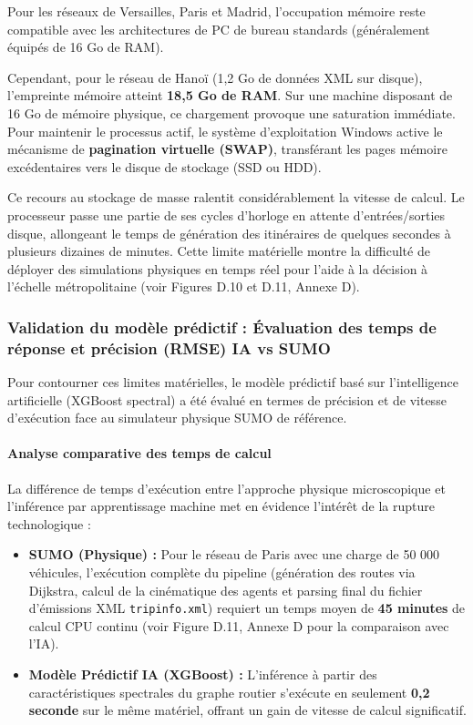 \documentclass[10pt, a4paper]{article}
\providecommand{\tightlist}{}
\begin{document}
Pour les réseaux de Versailles, Paris et Madrid, l'occupation mémoire
reste compatible avec les architectures de PC de bureau standards
(généralement équipés de 16 Go de RAM).

Cependant, pour le réseau de Hanoï (1,2 Go de données XML sur disque),
l'empreinte mémoire atteint \textbf{18,5 Go de RAM}. Sur une machine
disposant de 16 Go de mémoire physique, ce chargement provoque une
saturation immédiate. Pour maintenir le processus actif, le système
d'exploitation Windows active le mécanisme de \textbf{pagination
virtuelle (SWAP)}, transférant les pages mémoire excédentaires vers le
disque de stockage (SSD ou HDD).

Ce recours au stockage de masse ralentit considérablement la vitesse de
calcul. Le processeur passe une partie de ses cycles d'horloge en
attente d'entrées/sorties disque, allongeant le temps de génération des
itinéraires de quelques secondes à plusieurs dizaines de minutes. Cette
limite matérielle montre la difficulté de déployer des simulations
physiques en temps réel pour l'aide à la décision à l'échelle
métropolitaine (voir Figures D.10 et D.11, Annexe D).

\subsubsection{Validation du modèle prédictif : Évaluation des temps de
réponse et précision (RMSE) IA vs
SUMO}\label{validation-du-moduxe8le-pruxe9dictif-uxe9valuation-des-temps-de-ruxe9ponse-et-pruxe9cision-rmse-ia-vs-sumo}

Pour contourner ces limites matérielles, le modèle prédictif basé sur
l'intelligence artificielle (XGBoost spectral) a été évalué en termes de
précision et de vitesse d'exécution face au simulateur physique SUMO de
référence.

\paragraph{Analyse comparative des temps de
calcul}\label{analyse-comparative-des-temps-de-calcul}

La différence de temps d'exécution entre l'approche physique
microscopique et l'inférence par apprentissage machine met en évidence
l'intérêt de la rupture technologique :

\begin{itemize}
\tightlist
\item
  \textbf{SUMO (Physique) :} Pour le réseau de Paris avec une charge de
  50 000 véhicules, l'exécution complète du pipeline (génération des
  routes via Dijkstra, calcul de la cinématique des agents et parsing
  final du fichier d'émissions XML \texttt{tripinfo.xml}) requiert un
  temps moyen de \textbf{45 minutes} de calcul CPU continu (voir Figure
  D.11, Annexe D pour la comparaison avec l'IA).
\item
  \textbf{Modèle Prédictif IA (XGBoost) :} L'inférence à partir des
  caractéristiques spectrales du graphe routier s'exécute en seulement
  \textbf{0,2 seconde} sur le même matériel, offrant un gain de vitesse
  de calcul significatif.
\end{itemize}
\end{document}
